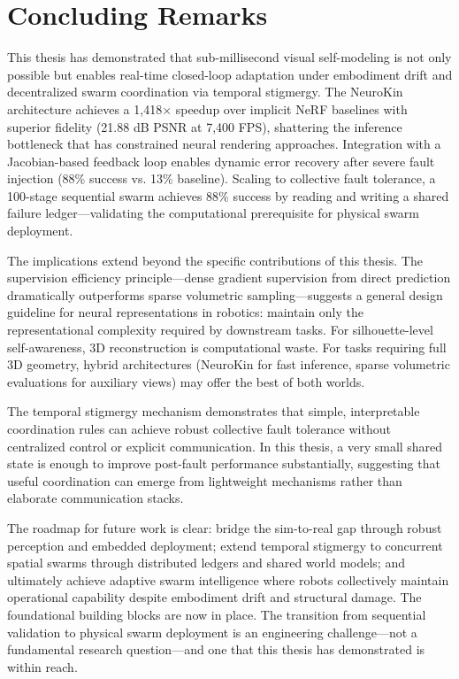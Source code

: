 ﻿\documentclass[12pt,a4paper,oneside]{report}
\begin{document}
\section{Concluding Remarks}

This thesis has demonstrated that sub-millisecond visual self-modeling is not only possible but enables real-time closed-loop adaptation under embodiment drift and decentralized swarm coordination via temporal stigmergy. The NeuroKin architecture achieves a 1,418$\times$ speedup over implicit NeRF baselines with superior fidelity (21.88 dB PSNR at 7,400 FPS), shattering the inference bottleneck that has constrained neural rendering approaches. Integration with a Jacobian-based feedback loop enables dynamic error recovery after severe fault injection (88\% success vs. 13\% baseline). Scaling to collective fault tolerance, a 100-stage sequential swarm achieves 88\% success by reading and writing a shared failure ledger---validating the computational prerequisite for physical swarm deployment.

The implications extend beyond the specific contributions of this thesis. The supervision efficiency principle---dense gradient supervision from direct prediction dramatically outperforms sparse volumetric sampling---suggests a general design guideline for neural representations in robotics: maintain only the representational complexity required by downstream tasks. For silhouette-level self-awareness, 3D reconstruction is computational waste. For tasks requiring full 3D geometry, hybrid architectures (NeuroKin for fast inference, sparse volumetric evaluations for auxiliary views) may offer the best of both worlds.

The temporal stigmergy mechanism demonstrates that simple, interpretable coordination rules can achieve robust collective fault tolerance without centralized control or explicit communication. In this thesis, a very small shared state is enough to improve post-fault performance substantially, suggesting that useful coordination can emerge from lightweight mechanisms rather than elaborate communication stacks.

The roadmap for future work is clear: bridge the sim-to-real gap through robust perception and embedded deployment; extend temporal stigmergy to concurrent spatial swarms through distributed ledgers and shared world models; and ultimately achieve adaptive swarm intelligence where robots collectively maintain operational capability despite embodiment drift and structural damage. The foundational building blocks are now in place. The transition from sequential validation to physical swarm deployment is an engineering challenge---not a fundamental research question---and one that this thesis has demonstrated is within reach.
\end{document}
